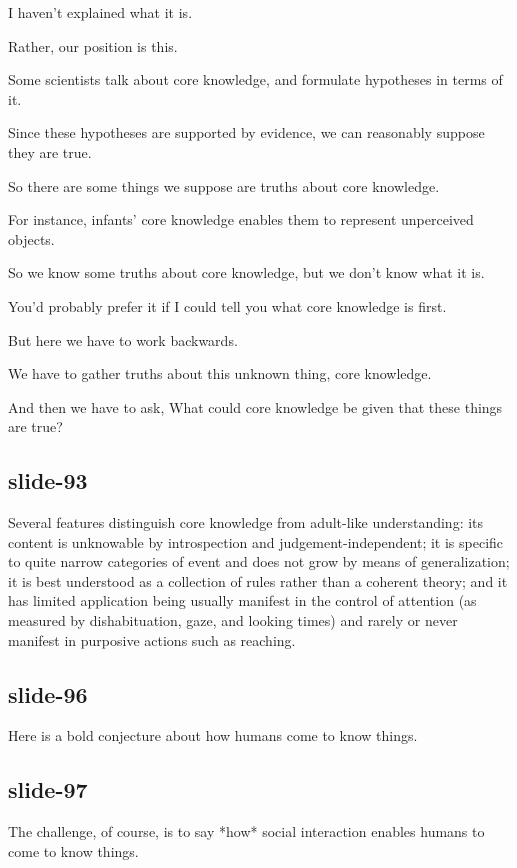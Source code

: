 \documentclass[12pt,\papersize]{extarticle}
\begin{document}
I haven't explained what it is.
 
Rather, our position is this.
 
Some scientists talk about core knowledge, and formulate hypotheses in terms of it.
 
Since these hypotheses are supported by evidence, we can reasonably suppose they are true.
 
So there are some things we suppose are truths about core knowledge.
 
For instance, infants' core knowledge enables them to represent unperceived objects.
 
So we know some truths about core knowledge, but we don't know what it is.
 
You'd probably prefer it if I could tell you what core knowledge is first.
 
But here we have to work backwards.
 
We have to gather truths about this unknown thing, core knowledge.
 
And then we have to ask, What could core knowledge be given that these things are true?
 
 
 
\subsection{slide-93}
Several features distinguish core knowledge from adult-like understanding: its content is unknowable by introspection and judgement-independent; it is specific to quite narrow categories of event and does not grow by means of generalization; it is best understood as a collection of rules rather than a coherent theory; and it has limited application being usually manifest in the control of attention (as measured by dishabituation, gaze, and looking times) and rarely or never manifest in purposive actions such as reaching.
 
 
 
\subsection{slide-96}
Here is a bold conjecture about how humans come to know things.
 
 
 
\subsection{slide-97}
The challenge, of course, is to say *how* social interaction enables humans to come to know things.
 
\end{document}

